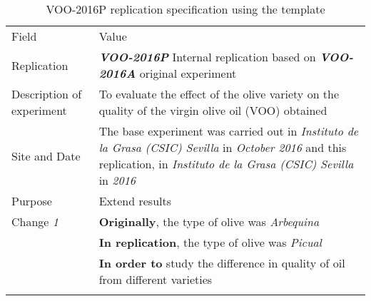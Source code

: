 \begin{table*}[h]
  \caption{VOO-2016P replication specification using the template}
\label{tab:edi}
  \centering

\begin{tabularx}{\textwidth}{
  >{\hsize=0.25\hsize}X
  >{\hsize=0.8\hsize}X}
  
    \noalign{\smallskip}\hline\noalign{\smallskip}
  
  Field &  Value  \\ 
  \noalign{\smallskip}\hline\noalign{\smallskip}
 
 Replication &   \textbf{\emph{VOO-2016P}}   Internal replication based on \textbf{\emph{VOO-2016A}}  original experiment   \\
     
 Description \newline of experiment &  To evaluate the effect of the olive variety on the quality of the virgin olive oil (VOO) obtained \\  
 
 Site and Date & The base experiment was carried out in  \textit{Instituto de la Grasa (CSIC) Sevilla}  in  \textit{October 2016} and this replication, in  \textit{Instituto de la Grasa (CSIC) Sevilla} in \textit{2016}    \\
    Purpose  &  Extend results \\  
\hline   
    Change \textit{1}   & \textbf{Originally}, the type of olive was \textit{Arbequina} \\& \textbf{In replication}, the type of olive was \textit{Picual} \\& \textbf{In order to} study the difference in quality of oil from different varieties   \\
    

    
   	\noalign{\smallskip\smallskip}\hline
	\end{tabularx}  
\end{table*}
